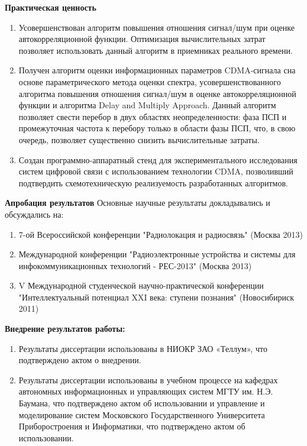 {\bf{Практическая ценность}}
\begin{enumerate}
	\item {Усовершенствован алгоритм повышения отношения сигнал/шум при оценке автокорреляционной функции. Оптимизация вычислительных затрат позволяет использовать
		данный алгоритм в приемниках реального времени.}
	\item {Получен алгоритм оценки информационных параметров CDMA-сигнала сна основе параметрического метода оценки спектра, усовершенствованного
		алгоритма повышения отношения сигнал/шум в оценке автокорреляционной функции и алгоритма Delay and Multiply Approach. Данный алгоритм
		позволяет свести перебор в двух областях неопределенности: фаза ПСП и промежуточная частота к перебору только в области фазы ПСП,
		что, в свою очередь, позволяет
		существенно снизить вычислительные затраты.}
	\item {Создан программно-аппаратный стенд для экспериментального исследования систем цифровой связи с использованием технологии CDMA,
		позволивший подтвердить схемотехническую реализуемость разработанных алгоритмов.}
\end{enumerate}

{\bf{Апробация результатов}}
Основные научные результаты докладывались и обсуждались на:
\begin{enumerate}
	\item 7-ой Всероссийской конференции "Радиолокация и радиосвязь" (Москва 2013)
	\item Международной конференции "Радиоэлектронные устройства и системы для инфокоммуникационных технологий - РЕС-2013" (Москва 2013)
	\item V Международной студенческой научно-практической конференции "Интеллектуальный потенциал XXI века: ступени познания" (Новосибириск 2011)
\end{enumerate}

{\bf{Внедрение результатов работы:}}
\begin{enumerate}
	\item Результаты диссертации использованы в НИОКР ЗАО «Теллум», что подтверждено актом о внедрении.
	\item Результаты диссертации использованы в учебном процессе на кафедрах автономных информационных и управляющих систем МГТУ им. Н.Э. Баумана,
		что подтверждено актом об использовании и управление и моделирование систем Московского Государственного Университета Приборостроения
		и Информатики, что подтверждено актом об использовании.
\end{enumerate}

